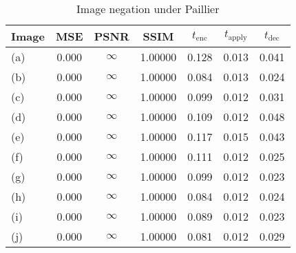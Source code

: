 \begin{table}[!ht]
	\centering
	\caption{Image negation under Paillier}
	\label{tbl:neg-pal}
    \begin{tabular}{lcccccc}
        \toprule
        Image & MSE  & PSNR & SSIM & $t_\text{enc}$ & $t_\text{apply}$ & $t_\text{dec}$ \\ \midrule
        (a) & 0.000 & $\infty$ & 1.00000 & 0.128 & 0.013 & 0.041 \\
		(b) & 0.000 & $\infty$ & 1.00000 & 0.084 & 0.013 & 0.024 \\
		(c) & 0.000 & $\infty$ & 1.00000 & 0.099 & 0.012 & 0.031 \\
		(d) & 0.000 & $\infty$ & 1.00000 & 0.109 & 0.012 & 0.048 \\
		(e) & 0.000 & $\infty$ & 1.00000 & 0.117 & 0.015 & 0.043 \\
		(f) & 0.000 & $\infty$ & 1.00000 & 0.111 & 0.012 & 0.025 \\
		(g) & 0.000 & $\infty$ & 1.00000 & 0.099 & 0.012 & 0.023 \\
		(h) & 0.000 & $\infty$ & 1.00000 & 0.084 & 0.012 & 0.024 \\
		(i) & 0.000 & $\infty$ & 1.00000 & 0.089 & 0.012 & 0.023 \\
		(j) & 0.000 & $\infty$ & 1.00000 & 0.081 & 0.012 & 0.029 \\
		\bottomrule
    \end{tabular}
\end{table}
